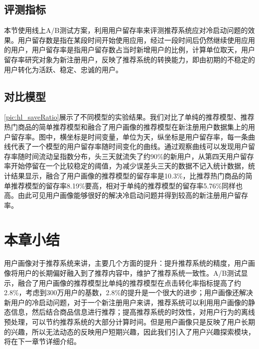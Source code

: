    \subsection{评测指标}
    本节使用线上A/B测试方案，利用用户留存率来评测推荐系统应对冷启动问题的效果。用户留存数是指在某段时间开始使用应用，经过一段时间后仍然继续使用应用的用户，用户留存率是指用户留存数占当时新增用户的比例，计算单位取天，用户留存率研究对象为新注册用户，反映了推荐系统的转换能力，即由初期的不稳定的用户转化为活跃、稳定、忠诚的用户。
    \subsection{对比模型}
    \autoref{pic:hl_saveRatio}展示了不同模型的实验结果。我们对比了单纯的推荐模型、推荐热门商品的简单推荐模型和融合了用户画像的推荐模型在新注册用户数据集上的用户留存率。图中，横坐标是时间变量，单位为天，纵坐标是用户留存率，每一条曲线代表了一个模型的用户留存率随时间变化的曲线。通过观察曲线可以发现用户留存率随时间流动呈指数分布，头三天就流失了约90\%的新用户，从第四天用户留存率开始停留在一个比较稳定的阈值，为减少误差头三天的数据不记入统计数据，统计结果显示，融合了用户画像的推荐模型的留存率是10.3\%，比推荐热门商品的简单推荐模型的留存率8.19\%要高，相对于单纯的推荐模型的留存率5.76\%同样也高。由此可见用户画像能够很好的解决冷启动问题并得到较高的新注册用户留存率。
    \begin{figure}
    \centering
      \label{pic:hl_saveRatio}
    \end{figure}

  \section{本章小结}
    用户画像对于推荐系统来讲，主要几个方面的提升：提升推荐系统的精度，用户画像将用户的长期偏好融入到了推荐内容中，维护了推荐系统一致性。A/B测试显示，融合了用户画像的推荐模型比单纯的推荐模型在点击转化率指标提高了约2.8\%，考虑到300万用户的基数，2.8\%的提升是一个很大的进步；用户画像还解决新用户的冷启动问题，对于一个新注册用户来讲，推荐系统可以利用用户画像的静态信息，然后结合商品信息进行推荐；提高推荐系统的时效性，对用户行为的离线预处理，可以节约推荐系统的大部分计算时间。但是用户画像只是反映了用户长期的兴趣，所以无法动态的反映用户短期兴趣，因此我们引入了用户兴趣探索模块，将在下一章节详细介绍。
